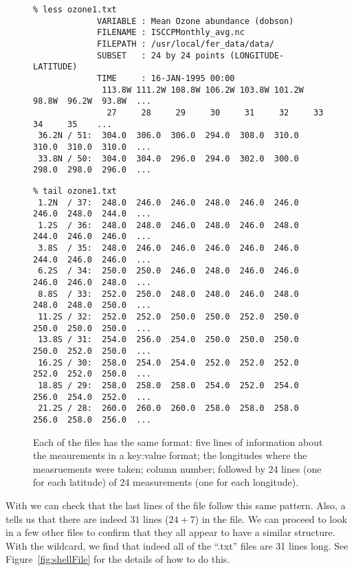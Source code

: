\begin{figure}
{\footnotesize{
\begin{verbatim}
% less ozone1.txt
             VARIABLE : Mean Ozone abundance (dobson)
             FILENAME : ISCCPMonthly_avg.nc
             FILEPATH : /usr/local/fer_data/data/
             SUBSET   : 24 by 24 points (LONGITUDE-LATITUDE)
             TIME     : 16-JAN-1995 00:00
              113.8W 111.2W 108.8W 106.2W 103.8W 101.2W 98.8W  96.2W  93.8W  ...
               27     28     29     30     31     32     33     34     35    ...
 36.2N / 51:  304.0  306.0  306.0  294.0  308.0  310.0  310.0  310.0  310.0  ...
 33.8N / 50:  304.0  304.0  296.0  294.0  302.0  300.0  298.0  298.0  296.0  ...
\end{verbatim}

\begin{verbatim}
% tail ozone1.txt
 1.2N  / 37:  248.0  246.0  246.0  248.0  246.0  246.0  246.0  248.0  244.0  ...
 1.2S  / 36:  248.0  248.0  246.0  248.0  246.0  248.0  244.0  246.0  246.0  ...
 3.8S  / 35:  248.0  246.0  246.0  246.0  246.0  246.0  244.0  246.0  246.0  ...
 6.2S  / 34:  250.0  250.0  246.0  248.0  246.0  246.0  246.0  246.0  248.0  ...
 8.8S  / 33:  252.0  250.0  248.0  248.0  246.0  248.0  248.0  248.0  250.0  ...
 11.2S / 32:  252.0  252.0  250.0  250.0  252.0  250.0  250.0  250.0  250.0  ...
 13.8S / 31:  254.0  256.0  254.0  250.0  250.0  250.0  250.0  252.0  250.0  ...
 16.2S / 30:  258.0  254.0  254.0  252.0  252.0  252.0  252.0  252.0  250.0  ...
 18.8S / 29:  258.0  258.0  258.0  254.0  252.0  254.0  256.0  254.0  252.0  ...
 21.2S / 28:  260.0  260.0  260.0  258.0  258.0  258.0  256.0  258.0  256.0  ...
\end{verbatim}
}}
\caption{Each of the files has the same format: five lines of
  information about the meaurements in a key:value format; the
  longitudes where the measruements were taken; column number;
  followed by 24 lines (one for each latitude) of 24 measurements (one
  for each longitude).}\label{fig:ozone1}
\end{figure}


With  we can check that the last lines of the file
follow this same pattern.  Also, a  tells us that there
are indeed $31$ lines ($24 + 7$) in the file.  We can proceed to look
in a few other files to confirm that they all appear to have a similar
structure.  With the wildcard, we find that indeed all of the ``.txt''
files are 31 lines long.  See Figure~\ref{fig:shellFile} for the
details of how to do this.


